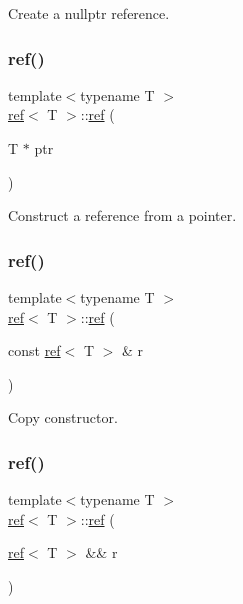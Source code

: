 Create a nullptr reference. 

\mbox{\label{classref_ac593e903c13a8dfe520978053ac4b319}} 
\subsubsection{\texorpdfstring{ref()}{ref()}\hspace{0.1cm}{\footnotesize\ttfamily [2/4]}}
{\footnotesize\ttfamily template$<$typename T $>$ \\
\mbox{\hyperlink{classref}{ref}}$<$ T $>$\+::\mbox{\hyperlink{classref}{ref}} (\begin{DoxyParamCaption}\item[{T $\ast$}]{ptr }\end{DoxyParamCaption})\hspace{0.3cm}{\ttfamily [inline]}}



Construct a reference from a pointer. 

\mbox{\label{classref_ab6041fce6b4a78faac0613b3b05e74e0}} 
\subsubsection{\texorpdfstring{ref()}{ref()}\hspace{0.1cm}{\footnotesize\ttfamily [3/4]}}
{\footnotesize\ttfamily template$<$typename T $>$ \\
\mbox{\hyperlink{classref}{ref}}$<$ T $>$\+::\mbox{\hyperlink{classref}{ref}} (\begin{DoxyParamCaption}\item[{const \mbox{\hyperlink{classref}{ref}}$<$ T $>$ \&}]{r }\end{DoxyParamCaption})\hspace{0.3cm}{\ttfamily [inline]}}



Copy constructor. 

\mbox{\label{classref_aad576503d5b820e6d1bbf33d881dc7a7}} 
\subsubsection{\texorpdfstring{ref()}{ref()}\hspace{0.1cm}{\footnotesize\ttfamily [4/4]}}
{\footnotesize\ttfamily template$<$typename T $>$ \\
\mbox{\hyperlink{classref}{ref}}$<$ T $>$\+::\mbox{\hyperlink{classref}{ref}} (\begin{DoxyParamCaption}\item[{\mbox{\hyperlink{classref}{ref}}$<$ T $>$ \&\&}]{r }\end{DoxyParamCaption})\hspace{0.3cm}{\ttfamily [inline]}}



